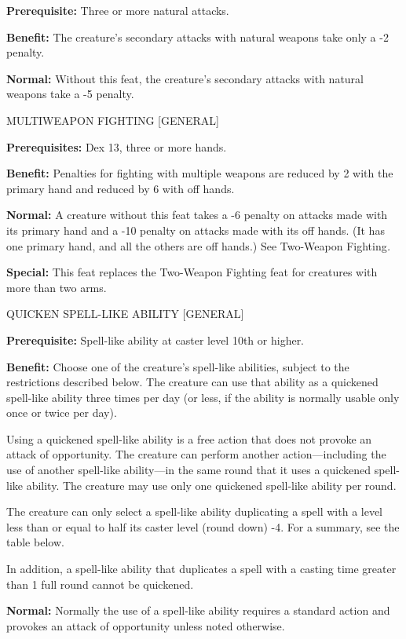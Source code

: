 \documentclass{article}
\begin{document}
\textbf{Prerequisite:} Three or more natural attacks.

\textbf{Benefit:} The creature's secondary attacks with natural weapons take only 
a -2 penalty.

\textbf{Normal:} Without this feat, the creature's secondary attacks with natural 
weapons take a -5 penalty.

\vspace{12pt}
MULTIWEAPON FIGHTING  [GENERAL]

\textbf{Prerequisites:} Dex 13, three or more hands.

\textbf{Benefit:} Penalties for fighting with multiple weapons are reduced by 2 
with the primary hand and reduced by 6 with off hands.

\textbf{Normal:} A creature without this feat takes a -6 penalty on attacks made 
with its primary hand and a -10 penalty on attacks made with its off hands. (It 
has one primary hand, and all the others are off hands.) See Two-Weapon Fighting\textit{.}

\textbf{Special:} This feat replaces the Two-Weapon Fighting feat for creatures 
with more than two arms.

\vspace{12pt}
QUICKEN SPELL-LIKE ABILITY  [GENERAL]

\textbf{Prerequisite:} Spell-like ability at caster level 10th or higher.

\textbf{Benefit:} Choose one of the creature's spell-like abilities, subject to 
the restrictions described below. The creature can use that ability as a quickened 
spell-like ability three times per day (or less, if the ability is normally usable 
only once or twice per day).

Using a quickened spell-like ability is a free action that does not provoke an 
attack of opportunity. The creature can perform another action---including the 
use of another spell-like ability---in the same round that it uses a quickened 
spell-like ability. The creature may use only one quickened spell-like ability 
per round.

The creature can only select a spell-like ability duplicating a spell with a level 
less than or equal to half its caster level (round down) -4. For a summary, see 
the table below.

In addition, a spell-like ability that duplicates a spell with a casting time greater 
than 1 full round cannot be quickened.

\textbf{Normal: }Normally the use of a spell-like ability requires a standard action 
and provokes an attack of opportunity unless noted otherwise.
\end{document}
